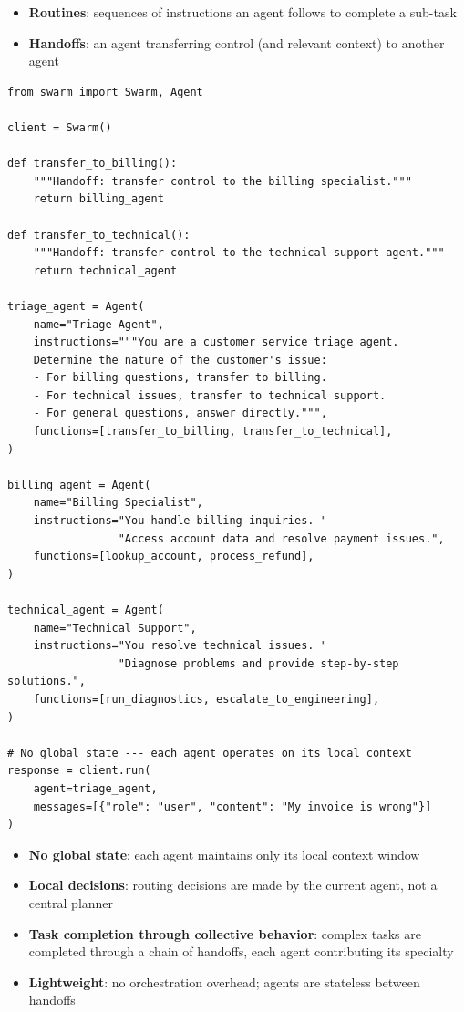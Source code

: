 \begin{itemize}
  \item \textbf{Routines}: sequences of instructions an agent follows to complete a sub-task
  \item \textbf{Handoffs}: an agent transferring control (and relevant context) to another agent
\end{itemize}

\begin{examplebox}
\begin{lstlisting}[style=pythonstyle]
from swarm import Swarm, Agent

client = Swarm()

def transfer_to_billing():
    """Handoff: transfer control to the billing specialist."""
    return billing_agent

def transfer_to_technical():
    """Handoff: transfer control to the technical support agent."""
    return technical_agent

triage_agent = Agent(
    name="Triage Agent",
    instructions="""You are a customer service triage agent.
    Determine the nature of the customer's issue:
    - For billing questions, transfer to billing.
    - For technical issues, transfer to technical support.
    - For general questions, answer directly.""",
    functions=[transfer_to_billing, transfer_to_technical],
)

billing_agent = Agent(
    name="Billing Specialist",
    instructions="You handle billing inquiries. "
                 "Access account data and resolve payment issues.",
    functions=[lookup_account, process_refund],
)

technical_agent = Agent(
    name="Technical Support",
    instructions="You resolve technical issues. "
                 "Diagnose problems and provide step-by-step solutions.",
    functions=[run_diagnostics, escalate_to_engineering],
)

# No global state --- each agent operates on its local context
response = client.run(
    agent=triage_agent,
    messages=[{"role": "user", "content": "My invoice is wrong"}]
)
\end{lstlisting}
\end{examplebox}

\begin{keybox}
\begin{itemize}
  \item \textbf{No global state}: each agent maintains only its local context window
  \item \textbf{Local decisions}: routing decisions are made by the current agent, not a central planner
  \item \textbf{Task completion through collective behavior}: complex tasks are completed through a chain of handoffs, each agent contributing its specialty
  \item \textbf{Lightweight}: no orchestration overhead; agents are stateless between handoffs
\end{itemize}
\end{keybox}

